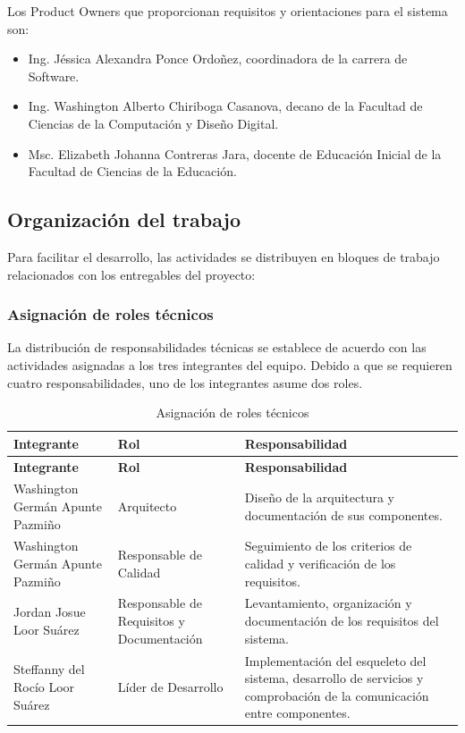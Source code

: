 Los Product Owners que proporcionan requisitos y orientaciones para el sistema son:

\begin{itemize}
    \item Ing. Jéssica Alexandra Ponce Ordoñez, coordinadora de la carrera de Software.
    \item Ing. Washington Alberto Chiriboga Casanova, decano de la Facultad de Ciencias de la Computación y Diseño Digital.
    \item Msc. Elizabeth Johanna Contreras Jara, docente de Educación Inicial de la Facultad de Ciencias de la Educación.
\end{itemize}

\subsection{Organización del trabajo}

Para facilitar el desarrollo, las actividades se distribuyen en bloques de trabajo relacionados con los entregables del proyecto:

\subsubsection{Asignación de roles técnicos}

La distribución de responsabilidades técnicas se establece de acuerdo con las actividades asignadas a los tres integrantes del equipo. Debido a que se requieren cuatro responsabilidades, uno de los integrantes asume dos roles.

\begin{longtable}{P{0.32\textwidth} P{0.28\textwidth} P{0.30\textwidth}}
\caption{Asignación de roles técnicos}\\
\toprule
\textbf{Integrante} & \textbf{Rol} & \textbf{Responsabilidad}\\
\midrule
\endfirsthead

\toprule
\textbf{Integrante} & \textbf{Rol} & \textbf{Responsabilidad}\\
\midrule
\endhead

Washington Germán Apunte Pazmiño &
Arquitecto &
Diseño de la arquitectura y documentación de sus componentes.\\

Washington Germán Apunte Pazmiño &
Responsable de Calidad &
Seguimiento de los criterios de calidad y verificación de los requisitos.\\

Jordan Josue Loor Suárez &
Responsable de Requisitos y Documentación &
Levantamiento, organización y documentación de los requisitos del sistema.\\

Steffanny del Rocío Loor Suárez &
Líder de Desarrollo &
Implementación del esqueleto del sistema, desarrollo de servicios y comprobación de la comunicación entre componentes.\\

\bottomrule
\end{longtable}

